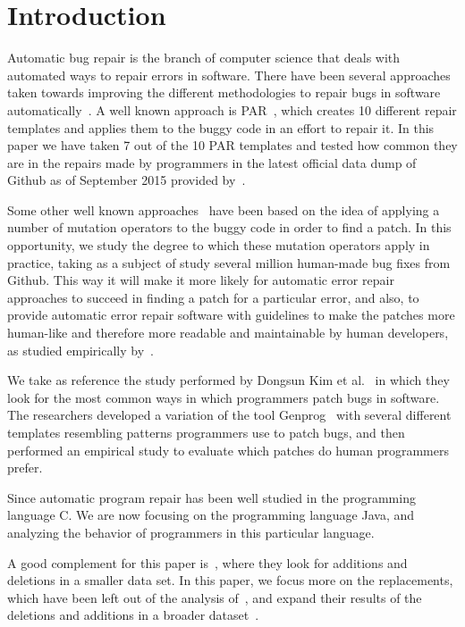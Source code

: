 \documentclass{sig-alternate-05-2015}
\begin{document}


\section{Introduction}

Automatic bug repair is the branch of computer science that deals with automated
ways to repair errors in software. There have been several approaches taken
towards improving the different methodologies to repair bugs in software
automatically~\cite{kim2013,weimer2009,legoues2012,pan2009}. A well known approach is PAR~\cite{kim2013}, which creates 10 different repair templates and applies them to the buggy code in an effort to repair
it. In this paper we have taken 7 out of the 10 PAR templates and tested how
common they are in the repairs made by programmers in the latest official data
dump of Github as of September 2015 provided by~\cite{dyer2013}.

Some other well known approaches~\cite{weimer2009,legoues2012} have been based on the idea of applying a number of mutation operators to the buggy code in order to find a patch. In this opportunity, we study the degree to which these mutation operators apply in practice, taking as a subject of study several million human-made bug fixes from Github. This way it will make it more likely for automatic error repair approaches to succeed in
finding a patch for a particular error, and also, to provide automatic error
repair software with guidelines to make the patches more human-like and
therefore more readable and maintainable by human developers, as studied empirically by~\cite{kim2013}.

We take as reference the study performed by Dongsun Kim et al.~\cite{kim2013} in which they look for the most common ways in which programmers patch bugs in software. The
researchers developed a variation of the tool Genprog~\cite{weimer2009,legoues2012}
with several different templates resembling patterns programmers use to patch
bugs, and then performed an empirical study to evaluate which patches do human programmers prefer.

Since automatic program repair has been well studied in the programming language C. We are now focusing on the programming language Java, and analyzing the behavior of programmers in this particular language.

A good complement for this paper is~\cite{zhong2015}, where they look for additions and
deletions in a smaller data set. In this paper, we focus more on the replacements,
which have been left out of the analysis of~\cite{zhong2015}, and expand their results of the deletions and additions in a broader dataset~\cite{dyer2013}.
\end{document}
